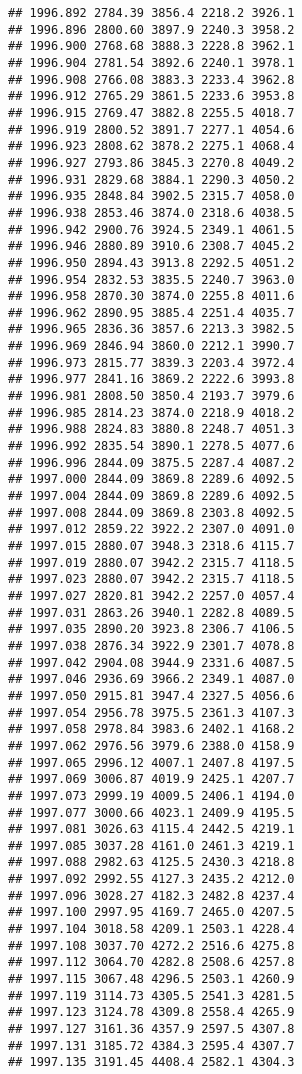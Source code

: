 \documentclass[
]{article}
\begin{document}
\begin{verbatim}
## 1996.892 2784.39 3856.4 2218.2 3926.1
## 1996.896 2800.60 3897.9 2240.3 3958.2
## 1996.900 2768.68 3888.3 2228.8 3962.1
## 1996.904 2781.54 3892.6 2240.1 3978.1
## 1996.908 2766.08 3883.3 2233.4 3962.8
## 1996.912 2765.29 3861.5 2233.6 3953.8
## 1996.915 2769.47 3882.8 2255.5 4018.7
## 1996.919 2800.52 3891.7 2277.1 4054.6
## 1996.923 2808.62 3878.2 2275.1 4068.4
## 1996.927 2793.86 3845.3 2270.8 4049.2
## 1996.931 2829.68 3884.1 2290.3 4050.2
## 1996.935 2848.84 3902.5 2315.7 4058.0
## 1996.938 2853.46 3874.0 2318.6 4038.5
## 1996.942 2900.76 3924.5 2349.1 4061.5
## 1996.946 2880.89 3910.6 2308.7 4045.2
## 1996.950 2894.43 3913.8 2292.5 4051.2
## 1996.954 2832.53 3835.5 2240.7 3963.0
## 1996.958 2870.30 3874.0 2255.8 4011.6
## 1996.962 2890.95 3885.4 2251.4 4035.7
## 1996.965 2836.36 3857.6 2213.3 3982.5
## 1996.969 2846.94 3860.0 2212.1 3990.7
## 1996.973 2815.77 3839.3 2203.4 3972.4
## 1996.977 2841.16 3869.2 2222.6 3993.8
## 1996.981 2808.50 3850.4 2193.7 3979.6
## 1996.985 2814.23 3874.0 2218.9 4018.2
## 1996.988 2824.83 3880.8 2248.7 4051.3
## 1996.992 2835.54 3890.1 2278.5 4077.6
## 1996.996 2844.09 3875.5 2287.4 4087.2
## 1997.000 2844.09 3869.8 2289.6 4092.5
## 1997.004 2844.09 3869.8 2289.6 4092.5
## 1997.008 2844.09 3869.8 2303.8 4092.5
## 1997.012 2859.22 3922.2 2307.0 4091.0
## 1997.015 2880.07 3948.3 2318.6 4115.7
## 1997.019 2880.07 3942.2 2315.7 4118.5
## 1997.023 2880.07 3942.2 2315.7 4118.5
## 1997.027 2820.81 3942.2 2257.0 4057.4
## 1997.031 2863.26 3940.1 2282.8 4089.5
## 1997.035 2890.20 3923.8 2306.7 4106.5
## 1997.038 2876.34 3922.9 2301.7 4078.8
## 1997.042 2904.08 3944.9 2331.6 4087.5
## 1997.046 2936.69 3966.2 2349.1 4087.0
## 1997.050 2915.81 3947.4 2327.5 4056.6
## 1997.054 2956.78 3975.5 2361.3 4107.3
## 1997.058 2978.84 3983.6 2402.1 4168.2
## 1997.062 2976.56 3979.6 2388.0 4158.9
## 1997.065 2996.12 4007.1 2407.8 4197.5
## 1997.069 3006.87 4019.9 2425.1 4207.7
## 1997.073 2999.19 4009.5 2406.1 4194.0
## 1997.077 3000.66 4023.1 2409.9 4195.5
## 1997.081 3026.63 4115.4 2442.5 4219.1
## 1997.085 3037.28 4161.0 2461.3 4219.1
## 1997.088 2982.63 4125.5 2430.3 4218.8
## 1997.092 2992.55 4127.3 2435.2 4212.0
## 1997.096 3028.27 4182.3 2482.8 4237.4
## 1997.100 2997.95 4169.7 2465.0 4207.5
## 1997.104 3018.58 4209.1 2503.1 4228.4
## 1997.108 3037.70 4272.2 2516.6 4275.8
## 1997.112 3064.70 4282.8 2508.6 4257.8
## 1997.115 3067.48 4296.5 2503.1 4260.9
## 1997.119 3114.73 4305.5 2541.3 4281.5
## 1997.123 3124.78 4309.8 2558.4 4265.9
## 1997.127 3161.36 4357.9 2597.5 4307.8
## 1997.131 3185.72 4384.3 2595.4 4307.7
## 1997.135 3191.45 4408.4 2582.1 4304.3

\end{verbatim}
\end{document}

